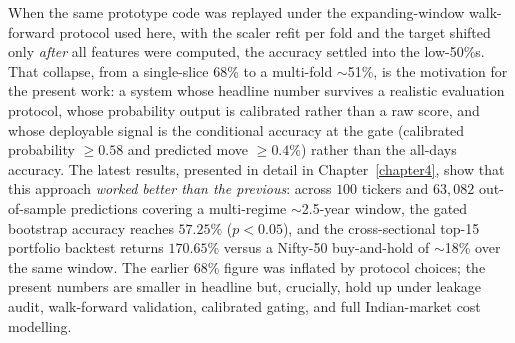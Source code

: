 When the same prototype code was replayed under the expanding-window walk-forward protocol used here, with the scaler refit per fold and the target shifted only \emph{after} all features were computed, the accuracy settled into the low-50\%s. That collapse, from a single-slice 68\% to a multi-fold $\sim$51\%, is the motivation for the present work: a system whose headline number survives a realistic evaluation protocol, whose probability output is calibrated rather than a raw score, and whose deployable signal is the conditional accuracy at the gate (calibrated probability $\geq 0.58$ and predicted move $\geq 0.4\%$) rather than the all-days accuracy. The latest results, presented in detail in Chapter~\ref{chapter4}, show that this approach \emph{worked better than the previous}: across $100$ tickers and $63{,}082$ out-of-sample predictions covering a multi-regime $\sim$2.5-year window, the gated bootstrap accuracy reaches $57.25\%$ ($p<0.05$), and the cross-sectional top-15 portfolio backtest returns $170.65\%$ versus a Nifty-50 buy-and-hold of $\sim$18\% over the same window. The earlier 68\% figure was inflated by protocol choices; the present numbers are smaller in headline but, crucially, hold up under leakage audit, walk-forward validation, calibrated gating, and full Indian-market cost modelling.

